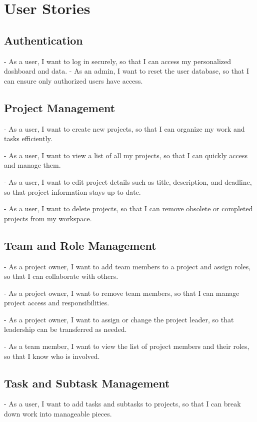 \documentclass{report}
\begin{document}

\printbibliography%

\appendix
\chapter{User Stories}
\section{Authentication}

- As a user, I want to log in securely, so that I can access my personalized dashboard and data.
- As an admin, I want to reset the user database, so that I can ensure only authorized users have access.

\section{Project Management}
- As a user, I want to create new projects, so that I can organize my work and tasks efficiently.

- As a user, I want to view a list of all my projects, so that I can quickly access and manage them.

- As a user, I want to edit project details such as title, description, and deadline, so that project information stays up to date.

- As a user, I want to delete projects, so that I can remove obsolete or completed projects from my workspace.


\section{Team and Role Management}
- As a project owner, I want to add team members to a project and assign roles, so that I can collaborate with others.

- As a project owner, I want to remove team members, so that I can manage project access and responsibilities.

- As a project owner, I want to assign or change the project leader, so that leadership can be transferred as needed.

- As a team member, I want to view the list of project members and their roles, so that I know who is involved.

\section{Task and Subtask Management}
- As a user, I want to add tasks and subtasks to projects, so that I can break down work into manageable pieces.
\end{document}
